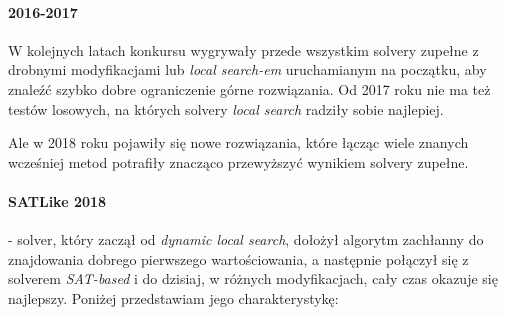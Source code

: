 \documentclass[shortabstract]{iithesis}
\begin{document}
\paragraph{2016-2017} W kolejnych latach konkursu wygrywały przede wszystkim solvery zupełne z drobnymi modyfikacjami lub \textit{local search-em} uruchamianym na początku, aby znaleźć szybko dobre ograniczenie górne rozwiązania. Od 2017 roku nie ma też testów losowych, na których solvery \textit{local search} radziły sobie najlepiej.

Ale w 2018 roku pojawiły się nowe rozwiązania, które łącząc wiele znanych wcześniej metod potrafiły znacząco przewyższyć wynikiem solvery zupełne. 

\paragraph{SATLike 2018 \cite{satlike}} - solver, który zaczął od \textit{dynamic local search}, dołożył algorytm zachłanny do znajdowania dobrego pierwszego wartościowania, a następnie połączył się z solverem \textit{SAT-based} i do dzisiaj, w różnych modyfikacjach, cały czas okazuje się najlepszy. Poniżej przedstawiam jego charakterystykę:
\end{document}
